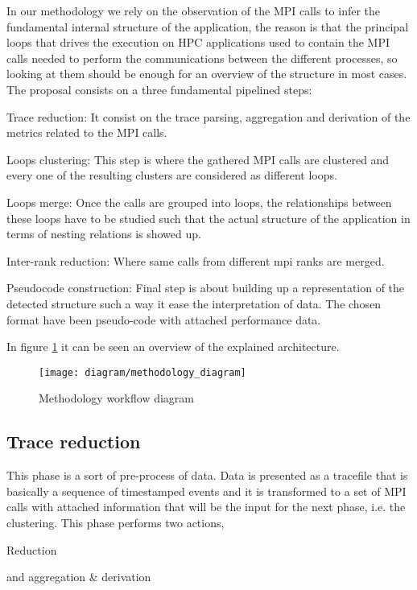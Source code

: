In our methodology we rely on the observation of the MPI calls to infer the
fundamental internal structure of the application, the reason is that the
principal loops that drives the execution on HPC applications used to contain
the MPI calls needed to perform the communications between the different
processes, so looking at them should be enough for an overview of the structure
in most cases. The proposal consists on a three fundamental pipelined steps:
\begin{enumerate*}[label=\roman*)]
  \item Trace reduction: It consist on the trace parsing, aggregation and
    derivation of the metrics related to the MPI calls.
  \item Loops clustering: This step is where the gathered MPI calls are
    clustered and every one of the resulting clusters are considered as different
    loops.
  \item Loops merge: Once the calls are grouped into loops, the relationships
    between these loops have to be studied such that the actual structure of the
    application in terms of nesting relations is showed up.
  \item Inter-rank reduction: Where same calls from different mpi ranks are
    merged.
  \item Pseudocode construction: Final step is about building up a
    representation of the detected structure such a way it ease the
    interpretation of data. The chosen format have been pseudo-code with
    attached performance data.
\end{enumerate*}
In figure \ref{fig:methodology_workdlow} it can be seen an overview of the 
explained architecture.

\begin{figure}[]
  \centering
  \texttt{[image: diagram/methodology\_diagram]}
  \caption{Methodology workflow diagram}
  \label{fig:methodology_workdlow}
\end{figure}

\subsection{Trace reduction}\label{ss:trace_reduction}

This phase is a sort of pre-process of data. Data is presented as a tracefile
that is basically a sequence of timestamped events and it is transformed to a
set of MPI calls with attached information that will be the input for the next
phase, i.e. the clustering. This phase performs two actions,
\begin{enumerate*}[label=\roman*)]
  \item Reduction
  \item and aggregation \& derivation
\end{enumerate*}


